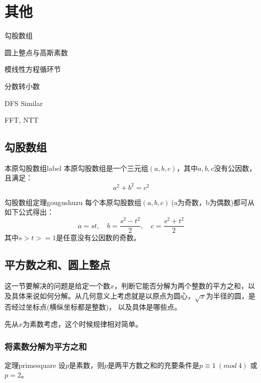 \chapter{其他}
\begin{introduction}[本章内容提要]
	\item 勾股数组
	\item 圆上整点与高斯素数
	\item 模线性方程循环节
	\item 分数转小数
	\item DFS Similar
	\item FFT, NTT
\end{introduction}

\section{勾股数组}

\begin{definition}{本原勾股数组}{label}
	本原勾股数组是一个三元组$(a,b,c)$，其中$a,b,c$没有公因数，且满足：
	$$a^2 + b^2 = c^2$$
\end{definition}

\begin{theorem}{勾股数组定理}{gougushuzu}
	每个本原勾股数组$(a,b,c)\ $(a为奇数，b为偶数)都可从如下公式得出：
	$$
	a=st ,\quad  b=\frac{s^2-t^2}{2},\quad  c=\frac{s^2+t^2}{2}
	$$
	其中$s>t>=1$是任意没有公因数的奇数。
\end{theorem}


\section{平方数之和、圆上整点}
这一节要解决的问题是给定一个数$x$，判断它能否分解为两个整数的平方之和，以及具体来说如何分解。从几何意义上考虑就是以原点为圆心，$\sqrt{x}$为半径的圆，是否经过坐标点(横纵坐标都是整数)，
以及具体是哪些点。

先从$x$为素数考虑，这个时候规律相对简单。
\subsection{将素数分解为平方之和}



\begin{theorem}{定理}{primesquare}
	设$p$是素数，则$p$是两平方数之和的充要条件是$p\equiv 1 \ (mod \ 4)   $ 或$p=2$。
\end{theorem}

